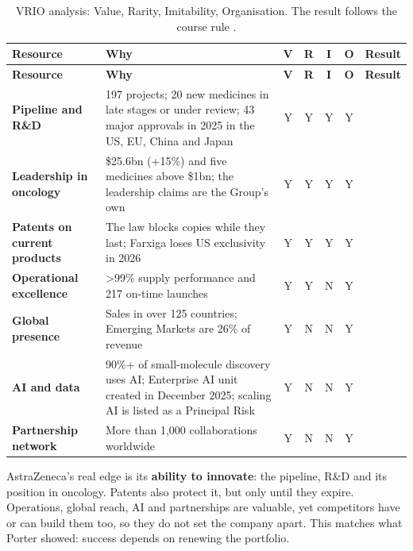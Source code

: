 \begin{xltabular}{\linewidth}{@{}N{2.4cm}Yccccp{2.5cm}@{}}
\caption{VRIO analysis: Value, Rarity, Imitability, Organisation. The result follows the course rule \cite[p.~26]{PLAN}.}\label{tab:vrio}\\*
\toprule
\textbf{Resource} & \textbf{Why} & \textbf{V} & \textbf{R} & \textbf{I} & \textbf{O} & \textbf{Result} \\*
\midrule
\endfirsthead
\toprule
\textbf{Resource} & \textbf{Why} & \textbf{V} & \textbf{R} & \textbf{I} & \textbf{O} & \textbf{Result} \\*
\midrule
\endhead
\bottomrule
\endfoot
\textbf{Pipeline and R\&D} & 197 projects; 20 new medicines in late stages or under review; 43 major approvals in 2025 in the US, EU, China and Japan \cite[pp.~28, 30]{AR} & Y & Y & Y & Y &  \\
\textbf{Leadership in oncology} & \$25.6bn (+15\%) and five medicines above \$1bn; the leadership claims are the Group's own \cite[pp.~4, 12--14]{AR} & Y & Y & Y & Y &  \\
\textbf{Patents on current products} & The law blocks copies while they last; Farxiga loses US exclusivity in 2026 \cite[pp.~9, 33]{AR} & Y & Y & Y & Y &  \\
\textbf{Operational excellence} & >99\% supply performance and 217 on-time launches \cite[pp.~4, 27]{AR} & Y & Y & N & Y &   \\
\textbf{Global presence} & Sales in over 125 countries; Emerging Markets are 26\% of revenue \cite[pp.~2, 32--33]{AR} & Y & N & N & Y &   \\
\textbf{AI and data} & 90\%+ of small-molecule discovery uses AI; Enterprise AI unit created in December 2025; scaling AI is listed as a Principal Risk \cite[pp.~36, 48]{AR} & Y & N & N & Y &   \\
\textbf{Partnership network} & More than 1,000 collaborations worldwide \cite[p.~37]{AR} & Y & N & N & Y &   \\
\end{xltabular}

\begin{analysis}
AstraZeneca's real edge is its \textbf{ability to innovate}: the pipeline, R\&D and its position in oncology. Patents also protect it, but only until they expire. Operations, global reach, AI and partnerships are valuable, yet competitors have or can build them too, so they do not set the company apart. This matches what Porter showed: success depends on renewing the portfolio.
\end{analysis}

